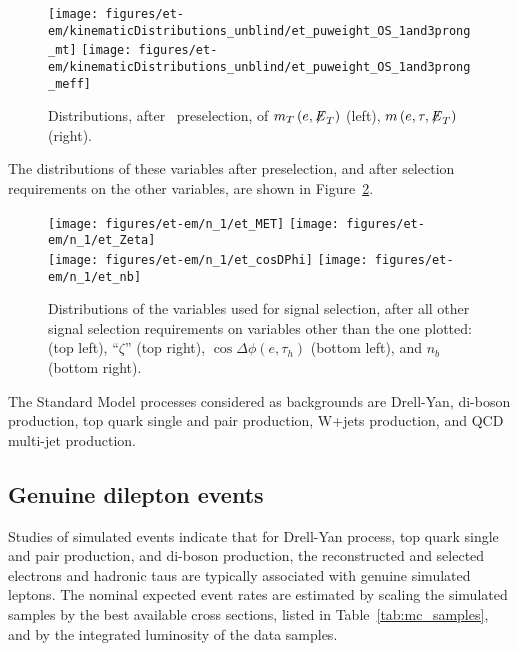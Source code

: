 \begin{figure}[thbp!]\centering
  \texttt{[image: figures/et-em/kinematicDistributions\_unblind/et\_puweight\_OS\_1and3prong\_mt]}
  \texttt{[image: figures/et-em/kinematicDistributions\_unblind/et\_puweight\_OS\_1and3prong\_meff]} \\
  \caption{\label{fig:et_preselection_distributions3} Distributions,
    after \teth ~preselection, of $m_{T}\left(e, {\not\mathrel{E}}_T\right)$
    (left), $m\left(e, \tau, {\not\mathrel{E}}_T\right)$ (right).}
\end{figure}

The distributions of these variables after preselection, and after
selection requirements on the other variables, are shown in
Figure~\ref{fig:et_nm1_distributions}.

\begin{figure}[thbp!]\centering
  \texttt{[image: figures/et-em/n\_1/et\_MET]}
  \texttt{[image: figures/et-em/n\_1/et\_Zeta]} \\
  \texttt{[image: figures/et-em/n\_1/et\_cosDPhi]}
  \texttt{[image: figures/et-em/n\_1/et\_nb]}
  \caption{\label{fig:et_nm1_distributions} Distributions of the
    variables used for \teth signal selection, after all other signal
    selection requirements on variables other than the one plotted:
    \ETslash (top left), ``$\zeta$'' (top right), $\cos{\Delta \phi
      (e,\tau_{h})}$ (bottom left), and $n_b$ (bottom right).}
\end{figure}

The Standard Model processes considered as backgrounds are Drell-Yan,
di-boson production, top quark single and pair production, W+jets
production, and QCD multi-jet production.

\subsection{Genuine dilepton events}

Studies of simulated events indicate that for Drell-Yan process, top
quark single and pair production, and di-boson production, the
reconstructed and selected electrons and hadronic taus are typically
associated with genuine simulated leptons.  The nominal expected event
rates are estimated by scaling the simulated samples by the best
available cross sections, listed in Table~\ref{tab:mc_samples}, and by
the integrated luminosity of the data samples.

